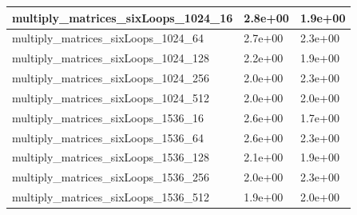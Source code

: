 \documentclass{scrartcl}
\begin{document}
\begin{table}[H]
\begin{tabular}{|l|l|l|}
multiply\_matrices\_sixLoops\_1024\_16  & 2.8e+00           & 1.9e+00            \\ \hline
multiply\_matrices\_sixLoops\_1024\_64  & 2.7e+00           & 2.3e+00            \\ \hline
multiply\_matrices\_sixLoops\_1024\_128 & 2.2e+00           & 1.9e+00            \\ \hline
multiply\_matrices\_sixLoops\_1024\_256 & 2.0e+00           & 2.3e+00            \\ \hline
multiply\_matrices\_sixLoops\_1024\_512 & 2.0e+00           & 2.0e+00            \\ \hline
multiply\_matrices\_sixLoops\_1536\_16  & 2.6e+00           & 1.7e+00            \\ \hline
multiply\_matrices\_sixLoops\_1536\_64  & 2.6e+00           & 2.3e+00            \\ \hline
multiply\_matrices\_sixLoops\_1536\_128 & 2.1e+00           & 1.9e+00            \\ \hline
multiply\_matrices\_sixLoops\_1536\_256 & 2.0e+00           & 2.3e+00            \\ \hline
multiply\_matrices\_sixLoops\_1536\_512 & 1.9e+00           & 2.0e+00            \\ \hline
\end{tabular}
\end{table}
\end{document}
